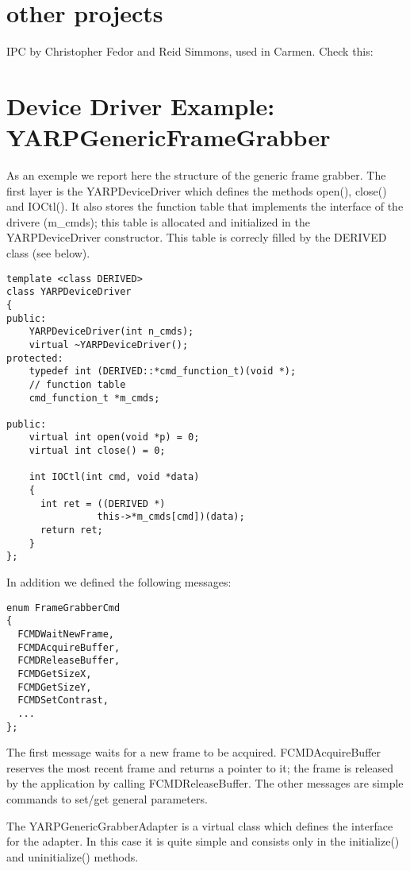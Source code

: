 \section{other projects}

IPC by Christopher Fedor and Reid Simmons, used in Carmen.
Check this: \cite{roy03IROS}



\section{Device Driver Example: YARPGenericFrameGrabber}

As an exemple we report here the structure of the generic frame grabber. The first layer is the YARPDeviceDriver which defines the methods open(), close() and IOCtl(). It also stores the function table that implements the interface of the drivere (m\_cmds); this table is allocated and initialized in the YARPDeviceDriver constructor. This table is correcly filled by the DERIVED class (see below).

{\small \begin{verbatim}
template <class DERIVED>
class YARPDeviceDriver
{
public:
	YARPDeviceDriver(int n_cmds);
	virtual ~YARPDeviceDriver();
protected:
	typedef int (DERIVED::*cmd_function_t)(void *);
	// function table
	cmd_function_t *m_cmds;

public:
	virtual int open(void *p) = 0;
	virtual int close() = 0;

	int IOCtl(int cmd, void *data)
	{
	  int ret = ((DERIVED *)
	            this->*m_cmds[cmd])(data);
	  return ret;
	}
};
\end{verbatim} }

In addition we defined the following messages:

{\small \begin{verbatim}
enum FrameGrabberCmd
{
  FCMDWaitNewFrame,
  FCMDAcquireBuffer,
  FCMDReleaseBuffer,
  FCMDGetSizeX,
  FCMDGetSizeY,
  FCMDSetContrast,
  ...
};
\end{verbatim} }

The first message waits for a new frame to be acquired. FCMDAcquireBuffer reserves the most recent frame and returns a pointer to it; the frame is released by the application by calling FCMDReleaseBuffer. The other messages are simple commands to set/get general parameters.

The YARPGenericGrabberAdapter is a virtual class which defines the interface for the adapter. In this case it is quite simple and consists only in the initialize() and uninitialize() methods. 

